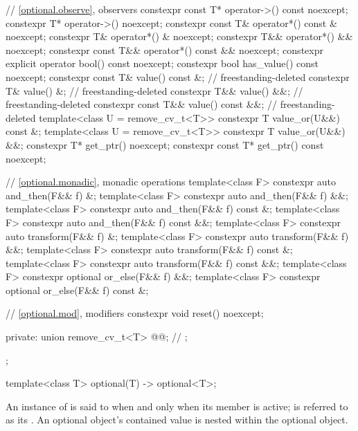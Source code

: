\begin{codeblock}
{{    // \ref{optional.observe}, observers
    constexpr const T* operator->() const noexcept;
    constexpr T* operator->() noexcept;
    constexpr const T& operator*() const & noexcept;
    constexpr T& operator*() & noexcept;
    constexpr T&& operator*() && noexcept;
    constexpr const T&& operator*() const && noexcept;
    constexpr explicit operator bool() const noexcept;
    constexpr bool has_value() const noexcept;
    constexpr const T& value() const &;                                 // freestanding-deleted
    constexpr T& value() &;                                             // freestanding-deleted
    constexpr T&& value() &&;                                           // freestanding-deleted
    constexpr const T&& value() const &&;                               // freestanding-deleted
    template<class U = remove_cv_t<T>> constexpr T value_or(U&&) const &;
    template<class U = remove_cv_t<T>> constexpr T value_or(U&&) &&;
    constexpr T* get_ptr() noexcept;
    constexpr const T* get_ptr() const noexcept;

    // \ref{optional.monadic}, monadic operations
    template<class F> constexpr auto and_then(F&& f) &;
    template<class F> constexpr auto and_then(F&& f) &&;
    template<class F> constexpr auto and_then(F&& f) const &;
    template<class F> constexpr auto and_then(F&& f) const &&;
    template<class F> constexpr auto transform(F&& f) &;
    template<class F> constexpr auto transform(F&& f) &&;
    template<class F> constexpr auto transform(F&& f) const &;
    template<class F> constexpr auto transform(F&& f) const &&;
    template<class F> constexpr optional or_else(F&& f) &&;
    template<class F> constexpr optional or_else(F&& f) const &;

    // \ref{optional.mod}, modifiers
    constexpr void reset() noexcept;

  private:
    union {
      remove_cv_t<T> @@;       // \expos
    };
  };

  template<class T>
    optional(T) -> optional<T>;
}
\end{codeblock}

\pnum
An instance of  is said to
when and only when
its member  is active;
 is referred to as its
.
An optional object's contained value
is nested within the optional object.


